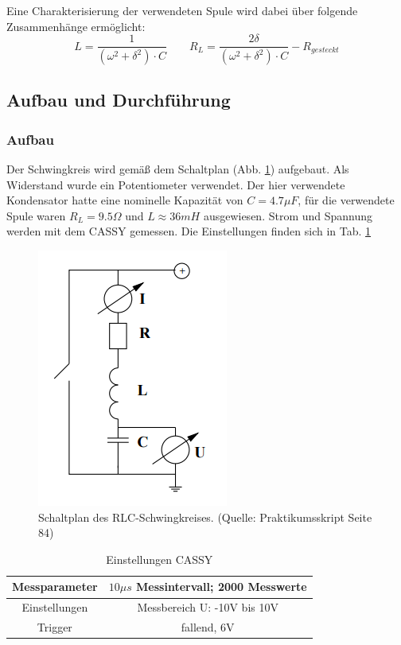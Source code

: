 \documentclass[12pt,a4paper]{article}
\begin{document}
Eine Charakterisierung der verwendeten Spule wird dabei über folgende Zusammenhänge ermöglicht:
\begin{equation}
L=\frac{1}{(\omega^2+\delta^2)\cdot C} \qquad  R_L=\frac{2\delta}{(\omega^2+\delta^2)\cdot C}-R_{gesteckt}
\end{equation}

\subsection{Aufbau und Durchführung}
\subsubsection{Aufbau}

Der Schwingkreis wird gemäß dem Schaltplan (Abb. \ref{fig:RLCSchaltung}) aufgebaut. Als Widerstand wurde ein Potentiometer verwendet. Der hier verwendete Kondensator hatte eine nominelle Kapazität von $C=4.7 \mu F$, für die verwendete Spule waren $R_L=9.5 \Omega$ und $L \approx 36mH$ ausgewiesen. Strom und Spannung werden mit dem CASSY gemessen. Die Einstellungen finden sich in Tab. \ref{tab:CASSY}

\begin{figure}
\begin{center}
\includegraphics[scale=0.8]{Bilder/RLCSchaltung.png}
\end{center}
\caption[RLC Schaltung]{Schaltplan des RLC-Schwingkreises. (Quelle: Praktikumsskript Seite 84)}
\label{fig:RLCSchaltung}
\end{figure}

\begin{table}
\begin{center}
\begin{tabular}{|c|c|}
\hline
Messparameter &  $10 \mu s$ Messintervall;  2000 Messwerte \\
\hline
Einstellungen & Messbereich U: -10V bis 10V\\
\hline
Trigger & fallend, 6V\\
\hline
\end{tabular}
\caption[CASSY]{Einstellungen CASSY}
\label{tab:CASSY}
\end{center}
\end{table}
\end{document}
